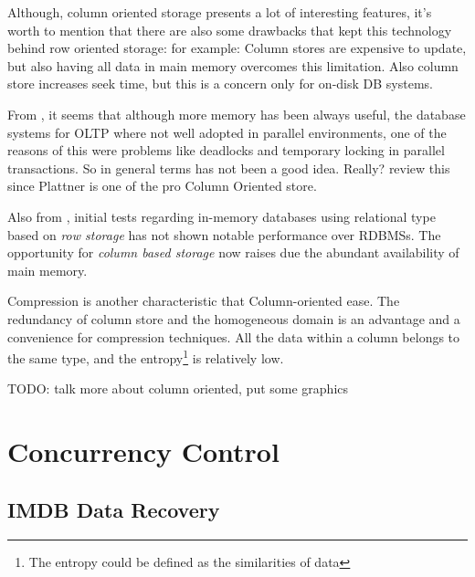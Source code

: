 \documentclass[10pt]{article} %
\begin{document}
Although, column oriented storage presents a lot of interesting features, it's worth to mention that there are also some drawbacks that kept this technology behind row oriented storage: for example: Column stores are expensive to update, but also having all data in main memory overcomes this limitation. Also column store increases seek time, but this is a concern only for on-disk DB systems.

From \cite{Plattner}, it seems that although more memory has been always useful, the database systems for OLTP where not well adopted in parallel environments, one of the reasons of this were problems like deadlocks and temporary locking in parallel transactions. So in general terms has not been a good idea. Really? review this since Plattner is one of the pro Column Oriented store.

Also from \cite{Plattner}, initial tests regarding in-memory databases using relational type based on \emph{ row storage } has not shown notable performance over RDBMSs. The opportunity for \emph{column based storage} now raises due the abundant availability of main memory. 

Compression is another characteristic that Column-oriented ease. The redundancy of column store and the homogeneous domain is an advantage and a convenience for compression techniques. All the data within a column belongs to the same type, and the entropy\footnote{The entropy could be defined as the similarities of data} is relatively low. 

TODO: talk more about column oriented, put some graphics

\section{Concurrency Control}

\subsection{IMDB Data Recovery}

\end{document}

